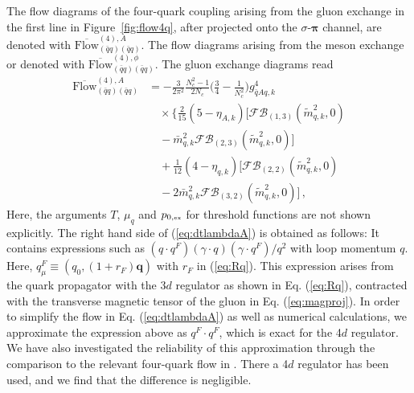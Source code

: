 \documentclass[%
reprint,
superscriptaddress,
showpacs,preprintnumbers,
 amsmath,amssymb,
 aps,
prd,
]{revtex4-1}
\def\Fig#1{Figure~\ref{#1}}
\def\eq#1{(\ref{#1})}
\begin{document}
The flow diagrams of the four-quark coupling arising from the gluon
exchange in the first line in \Fig{fig:flow4q}, after projected onto
the $\sigma$-$\bm\pi$ channel, are denoted with
$ \overline{\textrm{Flow}}^{(4),A}_{(\bar q q)(\bar q q)}$. The flow
diagrams arising from the meson exchange or denoted with
$\overline{\textrm{Flow}}^{(4),\phi}_{(\bar q q)(\bar q q)}$. The
gluon exchange diagrams read
%
\begin{align}
  \overline{\textrm{Flow}}^{(4),A}_{(\bar q q)(\bar q q)}
  &=-\frac{3}{2\pi^2}\frac{N_c^2-1}{2N_c}
    \Big(\frac{3}{4}-\frac{1}{N_c^2}\Big) g_{\bar q A q,k}^{4}
    \nonumber \\[1ex] 
  &\quad\times\bigg\{\frac{2}{15}(5-\eta_{A,k})\Big[
    \mathcal{FB}_{(1,3)}(\tilde{m}_{q,k}^{2},0)
    \nonumber \\[1ex] 
  &\quad-\bar{m}_{q,k}^{2}
    \mathcal{FB}_{(2,3)}(\tilde{m}_{q,k}^{2},0)
    \Big]\nonumber \\[1ex] 
  &\quad+\frac{1}{12}(4-\eta_{q,k})\Big[\mathcal{FB}_{(2,2)}(
    \tilde{m}_{q,k}^{2},0)\nonumber \\[1ex] 
  &\quad-2\bar{m}_{q,k}^{2}\mathcal{FB}_{(3,2)}(
    \tilde{m}_{q,k}^{2},0)\Big]\,,
 \label{eq:dtlambdaA}
\end{align}
%
Here, the arguments $T$, $\mu_q$ and $p_{0,\text{\tiny{ex}}}$ for
threshold functions are not shown explicitly. The right hand side of
\eq{eq:dtlambdaA} is obtained as follows: It contains expressions such
as $(q\cdot q^F)(\gamma \cdot q)(\gamma \cdot q^F)/q^2$ with loop
momentum $q$. Here, $q_{\mu}^F\equiv(q_0, (1+r_F) \bm{q})$ with $r_F$
in \eq{eq:Rq}. This expression arises from the quark propagator with
the 3$d$ regulator as shown in Eq. (\ref{eq:Rq}), contracted with the
transverse magnetic tensor of the gluon in Eq. (\ref{eq:magproj}). In
order to simplify the flow in Eq. (\ref{eq:dtlambdaA}) as well as
numerical calculations, we approximate the expression above as
$q^F\cdot q^F$, which is exact for the 4$d$ regulator. We have also
investigated the reliability of this approximation through the
comparison to the relevant four-quark flow in
\cite{Braun:2014ata}. There a 4$d$ regulator has been used, and we
find that the difference is negligible.
\end{document}
